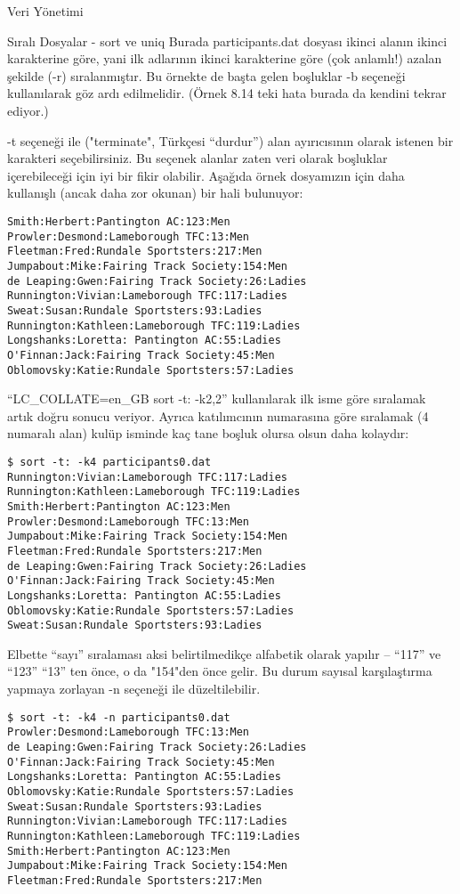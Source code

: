 \begin{section}{Veri Yönetimi}
\begin{subsection}{Sıralı Dosyalar - sort ve uniq}
Burada participants.dat dosyası ikinci alanın ikinci karakterine göre, yani ilk adlarının ikinci karakterine göre (çok anlamlı!) azalan şekilde (-r) sıralanmıştır. Bu örnekte de başta gelen boşluklar -b seçeneği kullanılarak göz ardı edilmelidir. (Örnek 8.14 teki hata burada da kendini tekrar ediyor.)

-t seçeneği ile ("terminate", Türkçesi “durdur”) alan ayırıcısının olarak istenen bir karakteri seçebilirsiniz. Bu seçenek alanlar zaten veri olarak boşluklar içerebileceği için iyi bir fikir olabilir. Aşağıda örnek dosyamızın için daha kullanışlı (ancak daha zor okunan) bir hali bulunuyor:

\footnotesize
\begin{verbatim}
Smith:Herbert:Pantington AC:123:Men
Prowler:Desmond:Lameborough TFC:13:Men
Fleetman:Fred:Rundale Sportsters:217:Men
Jumpabout:Mike:Fairing Track Society:154:Men
de Leaping:Gwen:Fairing Track Society:26:Ladies
Runnington:Vivian:Lameborough TFC:117:Ladies
Sweat:Susan:Rundale Sportsters:93:Ladies
Runnington:Kathleen:Lameborough TFC:119:Ladies
Longshanks:Loretta: Pantington AC:55:Ladies
O'Finnan:Jack:Fairing Track Society:45:Men
Oblomovsky:Katie:Rundale Sportsters:57:Ladies
\end{verbatim}
\normalsize

“LC\_COLLATE=en\_GB sort -t: -k2,2” kullanılarak ilk isme göre sıralamak artık doğru sonucu veriyor. Ayrıca katılımcının numarasına göre sıralamak (4 numaralı alan) kulüp isminde kaç tane boşluk olursa olsun daha kolaydır:

\footnotesize
\begin{verbatim}
$ sort -t: -k4 participants0.dat
Runnington:Vivian:Lameborough TFC:117:Ladies
Runnington:Kathleen:Lameborough TFC:119:Ladies
Smith:Herbert:Pantington AC:123:Men
Prowler:Desmond:Lameborough TFC:13:Men
Jumpabout:Mike:Fairing Track Society:154:Men
Fleetman:Fred:Rundale Sportsters:217:Men
de Leaping:Gwen:Fairing Track Society:26:Ladies
O'Finnan:Jack:Fairing Track Society:45:Men
Longshanks:Loretta: Pantington AC:55:Ladies
Oblomovsky:Katie:Rundale Sportsters:57:Ladies
Sweat:Susan:Rundale Sportsters:93:Ladies
\end{verbatim}
\normalsize

Elbette “sayı” sıralaması aksi belirtilmedikçe alfabetik olarak yapılır – “117” ve “123” “13” ten önce, o da "154"den önce gelir. Bu durum sayısal karşılaştırma yapmaya zorlayan -n seçeneği ile düzeltilebilir.

\footnotesize
\begin{verbatim}
$ sort -t: -k4 -n participants0.dat
Prowler:Desmond:Lameborough TFC:13:Men
de Leaping:Gwen:Fairing Track Society:26:Ladies
O'Finnan:Jack:Fairing Track Society:45:Men
Longshanks:Loretta: Pantington AC:55:Ladies
Oblomovsky:Katie:Rundale Sportsters:57:Ladies
Sweat:Susan:Rundale Sportsters:93:Ladies
Runnington:Vivian:Lameborough TFC:117:Ladies
Runnington:Kathleen:Lameborough TFC:119:Ladies
Smith:Herbert:Pantington AC:123:Men
Jumpabout:Mike:Fairing Track Society:154:Men
Fleetman:Fred:Rundale Sportsters:217:Men
\end{verbatim}
\normalsize


\end{subsection}
\end{section}
